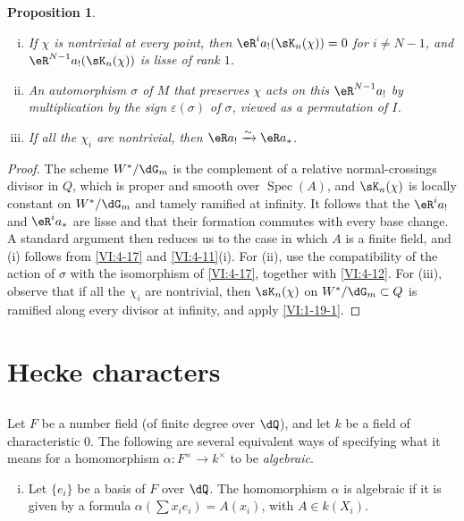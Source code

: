 \documentclass[12pt,oneside,english]{smfbook}
\DeclareMathOperator{\spec}{Spec}
\newcounter{char}
\newcommand{\iso}{\xrightarrow\sim}
\newtheorem{proposition_}[subsection]{Proposition}
\begin{document}
\begin{proposition_}\label{VI:4-20}
\begin{enumerate}[(i)]
  \item If $\chi$ is nontrivial at every point, then $\eR^ia_!(\sK_n(\chi))=0$ for $i\ne N-1$, and $\eR^{N-1}a_!(\sK_n(\chi))$ is lisse of rank $1$.
  \item An automorphism $\sigma$ of $M$ that preserves $\chi$ acts on this $\eR^{N-1}a_!$ by multiplication by the sign $\varepsilon(\sigma)$ of $\sigma$, viewed as a permutation of $I$.
  \item If all the $\chi_i$ are nontrivial, then $\eR a_!\iso\eR a_\ast$.
\end{enumerate}
\end{proposition_}
\begin{proof}
The scheme $W^\ast/\dG_m$ is the complement of a relative normal-crossings divisor in $Q$, which is proper and smooth over $\spec(A)$, and $\sK_n(\chi)$ is locally constant on $W^\ast/\dG_m$ and tamely ramified at infinity. It follows that the $\eR^ia_!$ and $\eR^ia_\ast$ are lisse and that their formation commutes with every base change. A standard argument then reduces us to the case in which $A$ is a finite field, and (i) follows from \ref{VI:4-17} and \ref{VI:4-11}(i). For (ii), use the compatibility of the action of $\sigma$ with the isomorphism of \ref{VI:4-17}, together with \ref{VI:4-12}. For (iii), observe that if all the $\chi_i$ are nontrivial, then $\sK_n(\chi)$ on $W^\ast/\dG_m\subset Q$ is ramified along every divisor at infinity, and apply \ref{VI:1-19-1}.
\end{proof}

\section{Hecke characters}\label{VI:5}

\subsection{}\label{VI:5-1}

Let $F$ be a number field (of finite degree over $\dQ$), and let $k$ be a field of characteristic $0$. The following are several equivalent ways of specifying what it means for a homomorphism $\alpha:F^\times\to k^\times$ to be \emph{algebraic}.
\begin{enumerate}[(i)]
  \item Let $\{e_i\}$ be a basis of $F$ over $\dQ$. The homomorphism $\alpha$ is algebraic if it is given by a formula $\alpha(\sum x_i e_i)=A(x_i)$, with $A\in k(X_i)$.
\end{enumerate}
\end{document}
